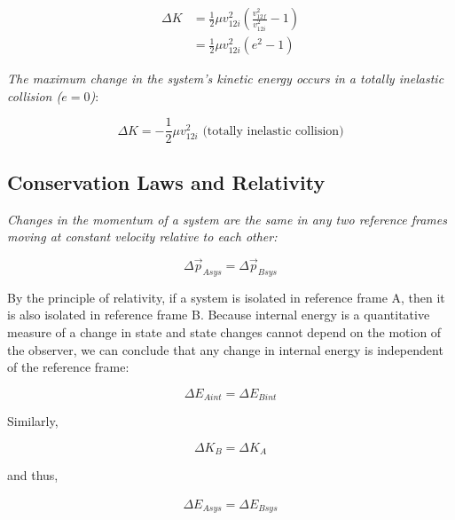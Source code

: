         \begin{align*}
            \Delta K    &= \frac{1}{2}\mu v^2_{12i} \left(\frac{v^2_{12f}}{v^2_{12i}}-1\right) \\
                        &= \frac{1}{2} \mu v^2_{12i} (e^2 -1)
        \end{align*}

        \textit{The maximum change in the system's kinetic energy occurs in a totally inelastic collision ($e=0$)}:

        \[
            \Delta K = -\frac{1}{2}\mu v^2_{12i} \text{ (totally inelastic collision)}
        \]




    \subsection{Conservation Laws and Relativity}

        \textit{Changes in the momentum of a system are the same in any two reference frames moving at constant velocity relative to each other:}

        \[
            \Delta \vec{p}_{Asys} = \Delta \vec{p}_{Bsys}
        \]

        By the principle of relativity, if a system is isolated in reference frame A, then it is also isolated in reference frame B. Because internal energy is a quantitative measure of a change in state and state
        changes cannot depend on the motion of the observer, we can conclude that any change in internal energy is independent of the reference frame:

        \[
            \Delta E_{Aint} = \Delta E_{Bint}
        \]

        Similarly,

        \[
            \Delta K_B = \Delta K_A
        \]

        and thus,

        \begin{align*}
            \Delta E_{Asys} = \Delta E_{Bsys}
        \end{align*}